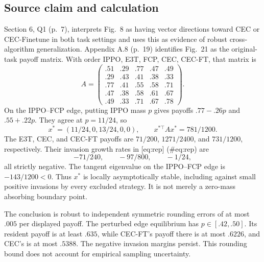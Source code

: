 \documentclass[10pt]{article}
\begin{document}
\subsection*{Source claim and calculation}
Section 6, Q1 (p. 7), interprets Fig. 8 as having vector directions toward CEC or CEC-Finetune in both task settings and uses this as evidence of robust cross-algorithm generalization. Appendix A.8 (p. 19) identifies Fig. 21 as the original-task payoff matrix. With order IPPO, E3T, FCP, CEC, CEC-FT, that matrix is \[A=\begin{pmatrix}
 .51&.29&.77&.47&.49\\
 .29&.43&.41&.38&.33\\
 .77&.41&.55&.58&.71\\
 .47&.38&.58&.61&.67\\
 .49&.33&.71&.67&.78
 \end{pmatrix}.\] On the IPPO–FCP edge, putting IPPO mass \(p\) gives payoffs \(.77-.26p\) and \(.55+.22p\). They agree at \(p=11/24\), so \[x^*=(11/24,0,13/24,0,0),\qquad x^{*\top}Ax^*=781/1200.\] The E3T, CEC, and CEC-FT payoffs are \(71/200\), \(1271/2400\), and \(731/1200\), respectively. Their invasion growth rates in [eq:rep] (\#eq:rep) are \[-71/240,\qquad -97/800,\qquad -1/24,\] all strictly negative. The tangent eigenvalue on the IPPO–FCP edge is \(-143/1200<0\). Thus \(x^*\) is locally asymptotically stable, including against small positive invasions by every excluded strategy. It is not merely a zero-mass absorbing boundary point.\par
The conclusion is robust to independent symmetric rounding errors of at most \(.005\) per displayed payoff. The perturbed edge equilibrium has \(p\in[.42,.50]\). Its resident payoff is at least \(.635\), while CEC-FT’s payoff there is at most \(.6226\), and CEC’s is at most \(.5388\). The negative invasion margins persist. This rounding bound does not account for empirical sampling uncertainty.\par
\end{document}
